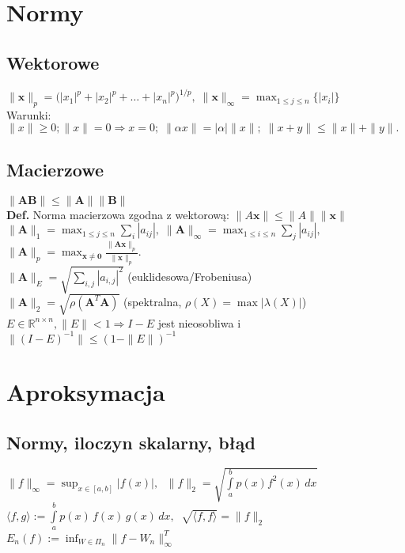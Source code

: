 \documentclass[a4paper,twocolumn]{article}
\begin{document}
\section{Normy}
\subsection{Wektorowe}
${\displaystyle \|\mathbf {x} \|_{p}={\bigl (}|x_{1}|^{p}+|x_{2}|^{p}+\ldots +|x_{n}|^{p}{\bigr )}^{1/p},\;\|\mathbf {x} \|_{\infty }=\max_{1 \leq j \leq n} {\bigl \{}|x_{i}| {\bigr \}}}$ \\
Warunki:\\
${\|x\|\geqslant 0; \displaystyle \|x\|=0\Rightarrow x=0;\; \|\alpha x\|=|\alpha |\|x\|;\;  \|x+y\|\leqslant \|x\|+\|y\|.}$
\subsection{Macierzowe}
${\displaystyle \|\mathbf {AB} \| \leq \|\mathbf {A} \| \|\mathbf {B} \|}$\\
\textbf{Def.} Norma macierzowa zgodna z wektorową: ${\displaystyle \|A \mathbf {x} \| \leq \| A \| \|\mathbf {x} \| }$
${\displaystyle \|\mathbf {A} \|_{1}=\max _{1 \leq j \leq n}\sum _{i}|a_{ij}|,\; \|\mathbf {A} \|_{\infty }=\max _{1\leq i\leq n}\sum _{j}|a_{ij}|,\;}$
${\displaystyle \|\mathbf {A} \|_{p}=\max _{\mathbf {x} \neq \mathbf {0} }{\tfrac {\|\mathbf {Ax} \|_{p}}{\|\mathbf {x} \|_{p}}}.}$\\
${\displaystyle \|\mathbf {A} \|_{E}=\sqrt{\sum_{i,j}|a_{i,j}|^2}}$ (euklidesowa/Frobeniusa)\\
${\displaystyle \|\mathbf {A} \|_{2}=\sqrt{\rho(\mathbf{A}^T\mathbf{A})}}$ (spektralna, $\rho(X) = \max |\lambda(X)|$)\\
$E \in \mathbb{R}^{n \times n}, \| E \| < 1 \Rightarrow I-E$ jest nieosobliwa i $\| (I-E)^{-1} \| \leq (1-\|E\|)^{-1}$


\section{Aproksymacja}

\subsection{Normy, iloczyn skalarny, błąd}
$\|f\|_\infty = \sup_{x \in [a,b]}|f(x)|,\;$
$\|f\|_2 = \sqrt{\int\limits_a^b p(x)f^2(x)\,dx}$\\
$\langle f, g \rangle := \int\limits_a^b p(x)\,f(x)\,g(x)\,dx,\;\; \sqrt{\langle f, f \rangle} = \|f\|_2$\\
$E_n(f) := \inf_{W \in \Pi_n} \|f-W_n\|_\infty^T$
\end{document}
